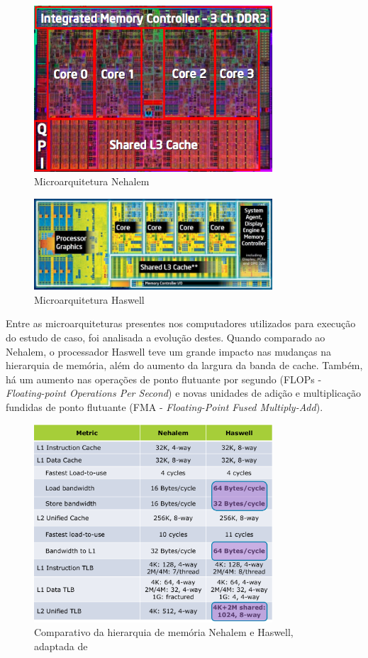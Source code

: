 \documentclass[conference]{IEEEtran}
\begin{document}
        \begin{figure}[ht]
        \centering
        \includegraphics[width=3.5in]{nehalem-diagram}
        \caption{Microarquitetura Nehalem \cite{nehalemb}}
        \label{fig: figa}
        \end{figure}
        
        \begin{figure}[ht]
        \centering
        \includegraphics[width=3.5in]{haswell-diagram}
        \caption{Microarquitetura Haswell \cite{haswellb}}
        \label{fig: figb}
        \end{figure}
        
        
        Entre as microarquiteturas presentes nos computadores utilizados para execução do estudo de caso, foi analisada a evolução destes. Quando comparado ao Nehalem, o processador Haswell teve um grande impacto nas mudanças na hierarquia de memória, além do aumento da largura da banda de cache. Também, há um aumento nas operações de ponto flutuante por segundo (FLOPs - \textit{Floating-point Operations Per Second}) e novas unidades  de adição e multiplicação fundidas de ponto flutuante (FMA - \textit{Floating-Point Fused Multiply-Add})\cite{jain2013haswell}.
    

        \begin{figure}[ht]
            \centering
            \includegraphics[width=3.5in]{nehalemvshaswell.png}
            \caption{Comparativo da hierarquia de memória Nehalem e Haswell, adaptada de \cite{hammarlund20134th}}
            \label{nhvshaswell}
        \end{figure}
        
\end{document}
